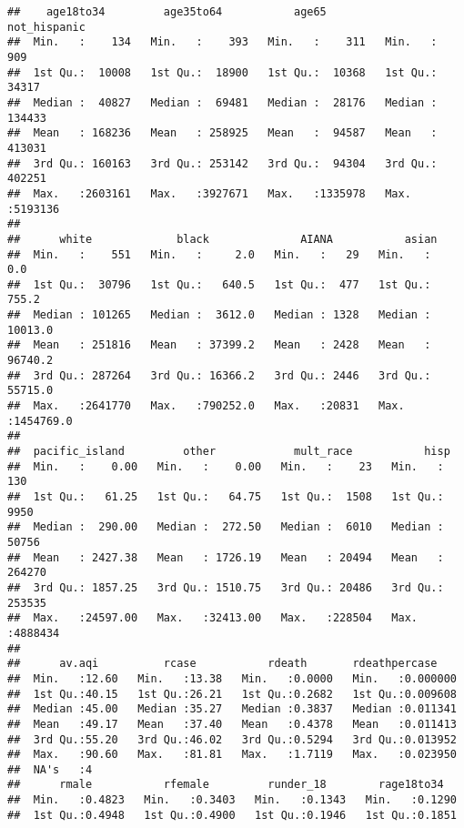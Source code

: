 \documentclass[
]{article}
\begin{document}
\begin{verbatim}
##    age18to34         age35to64           age65          not_hispanic    
##  Min.   :    134   Min.   :    393   Min.   :    311   Min.   :    909  
##  1st Qu.:  10008   1st Qu.:  18900   1st Qu.:  10368   1st Qu.:  34317  
##  Median :  40827   Median :  69481   Median :  28176   Median : 134433  
##  Mean   : 168236   Mean   : 258925   Mean   :  94587   Mean   : 413031  
##  3rd Qu.: 160163   3rd Qu.: 253142   3rd Qu.:  94304   3rd Qu.: 402251  
##  Max.   :2603161   Max.   :3927671   Max.   :1335978   Max.   :5193136  
##                                                                         
##      white             black              AIANA           asian          
##  Min.   :    551   Min.   :     2.0   Min.   :   29   Min.   :      0.0  
##  1st Qu.:  30796   1st Qu.:   640.5   1st Qu.:  477   1st Qu.:    755.2  
##  Median : 101265   Median :  3612.0   Median : 1328   Median :  10013.0  
##  Mean   : 251816   Mean   : 37399.2   Mean   : 2428   Mean   :  96740.2  
##  3rd Qu.: 287264   3rd Qu.: 16366.2   3rd Qu.: 2446   3rd Qu.:  55715.0  
##  Max.   :2641770   Max.   :790252.0   Max.   :20831   Max.   :1454769.0  
##                                                                          
##  pacific_island         other            mult_race           hisp        
##  Min.   :    0.00   Min.   :    0.00   Min.   :    23   Min.   :    130  
##  1st Qu.:   61.25   1st Qu.:   64.75   1st Qu.:  1508   1st Qu.:   9950  
##  Median :  290.00   Median :  272.50   Median :  6010   Median :  50756  
##  Mean   : 2427.38   Mean   : 1726.19   Mean   : 20494   Mean   : 264270  
##  3rd Qu.: 1857.25   3rd Qu.: 1510.75   3rd Qu.: 20486   3rd Qu.: 253535  
##  Max.   :24597.00   Max.   :32413.00   Max.   :228504   Max.   :4888434  
##                                                                          
##      av.aqi          rcase           rdeath       rdeathpercase     
##  Min.   :12.60   Min.   :13.38   Min.   :0.0000   Min.   :0.000000  
##  1st Qu.:40.15   1st Qu.:26.21   1st Qu.:0.2682   1st Qu.:0.009608  
##  Median :45.00   Median :35.27   Median :0.3837   Median :0.011341  
##  Mean   :49.17   Mean   :37.40   Mean   :0.4378   Mean   :0.011413  
##  3rd Qu.:55.20   3rd Qu.:46.02   3rd Qu.:0.5294   3rd Qu.:0.013952  
##  Max.   :90.60   Max.   :81.81   Max.   :1.7119   Max.   :0.023950  
##  NA's   :4                                                          
##      rmale           rfemale         runder_18        rage18to34    
##  Min.   :0.4823   Min.   :0.3403   Min.   :0.1343   Min.   :0.1290  
##  1st Qu.:0.4948   1st Qu.:0.4900   1st Qu.:0.1946   1st Qu.:0.1851  

\end{verbatim}
\end{document}
